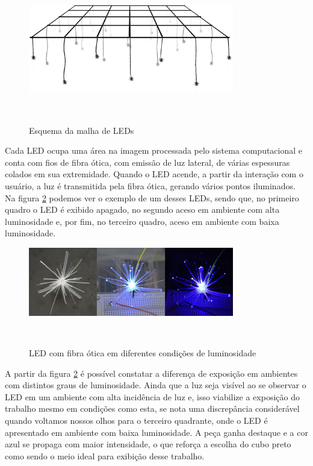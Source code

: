 \begin{figure}[H]
  \begin{center}
    \caption{Esquema da malha de LEDs}
    \vspace*{0,2cm}
    \includegraphics[width=0.8\textwidth]{./04-figuras/malha}
    \label{fig:malha}
  \end{center}
  \vspace*{-0,5cm}
  \\
\end{figure}


Cada LED ocupa uma área na imagem processada pelo sistema computacional e conta com fios de fibra ótica, com emissão de luz lateral, de várias espessuras colados em sua extremidade. Quando o LED acende, a partir da interação com o usuário, a luz é transmitida pela fibra ótica, gerando vários pontos iluminados. Na figura \ref{fig:led_fibra_otica} podemos ver o exemplo de um desses LEDs, sendo que, no primeiro quadro o LED é exibido apagado, no segundo aceso em ambiente com alta luminosidade e, por fim, no terceiro quadro, aceso em ambiente com baixa luminosidade. 

\begin{figure}[H]
  \begin{center}
    \caption{LED com fibra ótica em diferentes condições de luminosidade}
    \vspace*{0,2cm}
    \includegraphics[width=0.8\textwidth]{./04-figuras/led_fibra_otica}
    \label{fig:led_fibra_otica}
  \end{center}
  \vspace*{-0,5cm}
  \\
\end{figure}

A partir da figura \ref{fig:led_fibra_otica} é possível constatar a diferença de exposição em ambientes com distintos graus de luminosidade. Ainda que a luz seja visível ao se observar o LED em um ambiente com alta incidência de luz e, isso viabilize a exposição do trabalho mesmo em condições como esta, se nota uma discrepância considerável quando voltamos nossos olhos para o terceiro quadrante, onde o LED é apresentado em ambiente com baixa luminosidade. A peça ganha destaque e a cor azul se propaga com maior intensidade, o que reforça a escolha do cubo preto como sendo o meio ideal para exibição desse trabalho.

   